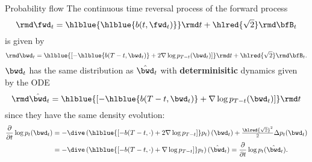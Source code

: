 \begin{frame}{Probability flow \cite{song2021Scorebased}}
%
The continuous time reversal process of the forward process
\begin{equation}
  \rmd \fwd_t = \hlblue{\hlblue{b(t, \fwd_t)}} \rmd t + \hlred{\sqrt{2}} \rmd \bfB_t
\end{equation}
is given by
\begin{equation}
  \rmd \bwd_t = \hlblue{\left[ -\hlblue{b(T-t, \bwd_t)} + 2 \nabla \log p_{T-t}(\bwd_t)\right] } \rmd t + \hlred{\sqrt{2}} \rmd \bfB_t.
\end{equation}
\pause
%
${\bwd}_t$ has the same distribution as $\hat{\bwd}_t$ with \textbf{determinisitic} dynamics given by the ODE
\begin{equation}
  \rmd \hat{\bwd}_t = \hlblue{\left[ -\hlblue{b(T-t, \bwd_t)} + \nabla \log p_{T-t}(\bwd_t)\right] } \rmd t
\end{equation}
since they have the same density evolution:
\begin{align}
  \frac{\partial}{\partial t} \log p_t({\bwd}_t) 
  &= -\dive\left( \hlblue{\left[-b(T-t, \cdot) + 2 \nabla \log p_{T-t} \right]} p_t \right) ({\bwd}_t) + \tfrac{\hlred{\sqrt{2}}^2}{2} \Delta p_t ({\bwd}_t) \\
  &= -\dive\left( \hlblue{\left[ -b(T-t, \cdot) + \nabla \log p_{T-t} \right]} p_t \right) (\hat{\bwd}_t)
  = \frac{\partial}{\partial t} \log p_t(\hat{\bwd}_t).
\end{align}

\end{frame}



